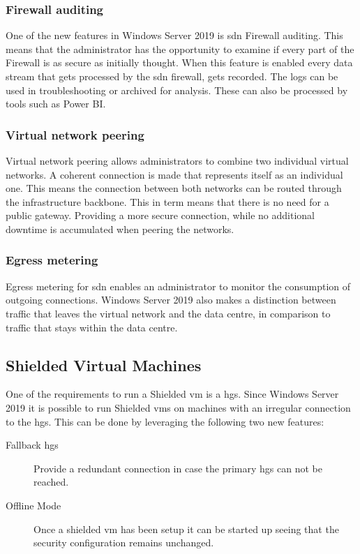 \subsubsection{Firewall auditing}
One of the new features in Windows Server 2019 is \acrshort{sdn} Firewall auditing. 
This means that the administrator has the opportunity to examine if every part of the Firewall is as secure as initially thought. 
When this feature is enabled every data stream that gets processed by the \acrshort{sdn} firewall, gets recorded. 
The logs can be used in troubleshooting or archived for analysis. 
These can also be processed by tools such as Power BI.

\subsubsection{Virtual network peering}
Virtual network peering allows administrators to combine two individual virtual networks. 
A coherent connection is made that represents itself as an individual one. 
This means the connection between both networks can be routed through the infrastructure backbone. 
This in term means that there is no need for a public gateway. 
Providing a more secure connection, while no additional downtime is accumulated when peering the networks.

\subsubsection{Egress metering}
Egress metering for \acrshort{sdn} enables an administrator to monitor the consumption of outgoing connections.
Windows Server 2019 also makes a distinction between traffic that leaves the virtual network and the data centre, in comparison to traffic that stays within the data centre. 

\subsection{Shielded Virtual Machines}
One of the requirements to run a Shielded \acrshort{vm} is a \acrfull{hgs}. 
Since Windows Server 2019 it is possible to run Shielded \acrshort{vm}s on machines with an irregular connection to the \acrshort{hgs}. 
This can be done by leveraging the following two new features:

\begin{description}
	\item[Fallback \acrshort{hgs}] Provide a redundant connection in case the primary \acrshort{hgs} can not be reached.
	\item[Offline Mode] Once a shielded \acrshort{vm} has been setup it can be started up seeing that the security configuration remains unchanged.
\end{description}

